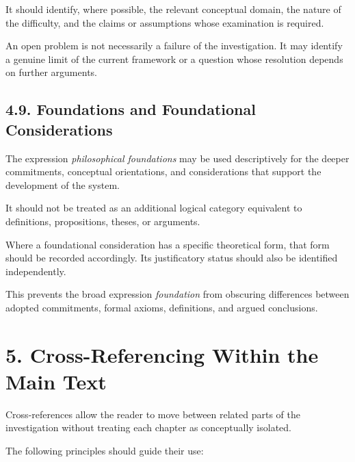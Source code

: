 It should identify, where possible, the relevant
conceptual domain, the nature of the difficulty,
and the claims or assumptions whose examination
is required.

An open problem is not necessarily a failure
of the investigation. It may identify a genuine
limit of the current framework or a question
whose resolution depends on further arguments.

\subsection*{4.9. Foundations and Foundational Considerations}

The expression \textit{philosophical foundations}
may be used descriptively for the deeper
commitments, conceptual orientations, and
considerations that support the development
of the system.

It should not be treated as an additional
logical category equivalent to definitions,
propositions, theses, or arguments.

Where a foundational consideration has a
specific theoretical form, that form should
be recorded accordingly. Its justificatory
status should also be identified independently.

This prevents the broad expression
\textit{foundation} from obscuring differences
between adopted commitments, formal axioms,
definitions, and argued conclusions.


\section*{5. Cross-Referencing Within the Main Text}

Cross-references allow the reader to move between
related parts of the investigation without treating
each chapter as conceptually isolated.

The following principles should guide their use:

